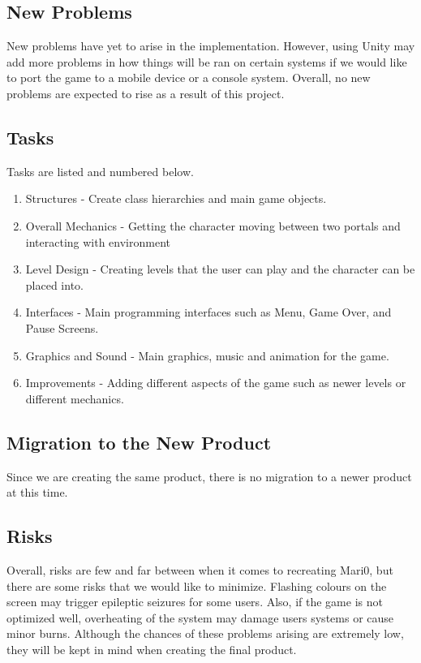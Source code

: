 \documentclass[12pt, titlepage]{article}
\begin{document}
\subsection{New Problems}
New problems have yet to arise in the implementation. However, using Unity may add more problems in how things will be ran on certain systems if we would like to port the game to a mobile device or a console system. Overall, no new problems are expected to rise as a result of this project.

\subsection{Tasks}
Tasks are listed and numbered below.
\begin{enumerate}
\item Structures - Create class hierarchies and main game objects.
\item Overall Mechanics - Getting the character moving between two portals and interacting with environment
\item Level Design - Creating levels that the user can play and the character can be placed into.
\item Interfaces - Main programming interfaces such as Menu, Game Over, and Pause Screens.
\item Graphics and Sound - Main graphics, music and animation for the game.
\item Improvements - Adding different aspects of the game such as newer levels or different mechanics.
\end{enumerate}

\subsection{Migration to the New Product}
Since we are creating the same product, there is no migration to a newer product at this time.

\subsection{Risks}
Overall, risks are few and far between when it comes to recreating Mari0, but there are some risks that we would like to minimize. Flashing colours on the screen may trigger epileptic seizures for some users. Also, if the game is not optimized well, overheating of the system may damage users systems or cause minor burns. Although the chances of these problems arising are extremely low, they will be kept in mind when creating the final product.
\end{document}
